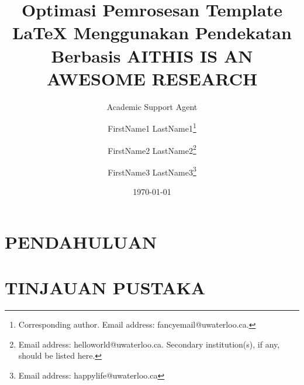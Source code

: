 \documentclass{standalone}
\title{Optimasi Pemrosesan Template LaTeX Menggunakan Pendekatan Berbasis AI}
\author{Academic Support Agent}
\date{\today}
\begin{document}
\maketitle

\begin{abstract}

\end{abstract}

\chapter{PENDAHULUAN}


\chapter{TINJAUAN PUSTAKA}



\usepackage{authblk}
\renewcommand*{\Authsep}{\authorcr}
\renewcommand*{\Authand}{\authorcr}
\renewcommand*{\Authands}{\authorcr}



\title{THIS IS AN AWESOME RESEARCH}



\author{FirstName1 LastName1\thanks{Corresponding author. Email address: fancyemail@uwaterloo.ca.}}
\author{FirstName2 LastName2\thanks{Email address: helloworld@uwaterloo.ca. Secondary institution(s), if any, should be listed here.}}

\author{FirstName3 LastName3\thanks{Email address: happylife@uwaterloo.ca}}
\end{document}
